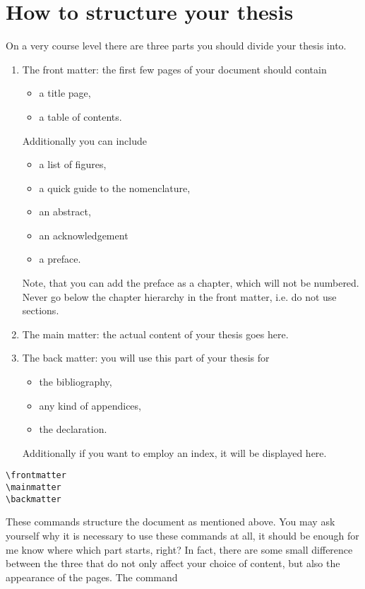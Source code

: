 \section{How to structure your thesis}\label{sec:struc}
On a very course level there are three parts you should divide your thesis into. 
\begin{enumerate}
\item The front matter: the first few pages of your document should contain 
\begin{itemize}
\item a title page,
\item a table of contents. 
\end{itemize}
Additionally you can include
\begin{itemize}
\item a list of figures, 
\item a quick guide to the nomenclature, 
\item an abstract, 
\item an acknowledgement
\item a preface.
\end{itemize}
Note, that you can add the preface as a chapter, which will not be numbered. 
Never go below the chapter hierarchy in the front matter, i.e. do not use sections.
\item The main matter: the actual content of your thesis goes here.
\item The back matter: you will use this part of your thesis for 
\begin{itemize}
\item the bibliography,
\item any kind of appendices,
\item the declaration.
\end{itemize}
Additionally if you want to employ an index, it will be displayed here.
\end{enumerate}
\begin{emphBox}
\lstinline|\frontmatter|\\
\lstinline|\mainmatter|\\
\lstinline|\backmatter|
\end{emphBox}
These commands structure the document as mentioned above. You may ask yourself why it is 
necessary to use these commands at all, it should be enough for me know where which part 
starts, right? In fact, there are some small difference between the three that do not 
only affect your choice of content, but also the appearance of the pages. The command 
